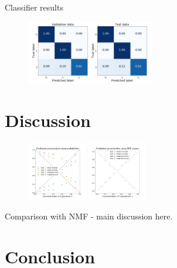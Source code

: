 \documentclass{article}
\begin{document}
Classifier results


\begin{figure}
  
  \includegraphics[width=0.5\textwidth]{figures_2/raman_sim_3_conf_matrix13.png}

\end{figure}

\section{Discussion}
\label{sec:discussion}


\begin{figure}
  \includegraphics[width=0.23\textwidth]{figures_2/DNN_pred_conc_prob.png}
  \includegraphics[width=0.23\textwidth]{figures_2/nmf_pred_conc.png}
\end{figure}

Comparison with NMF - main discussion here.

\section{Conclusion}
\label{sec:conclusion}



\vfill
\pagebreak
\end{document}
